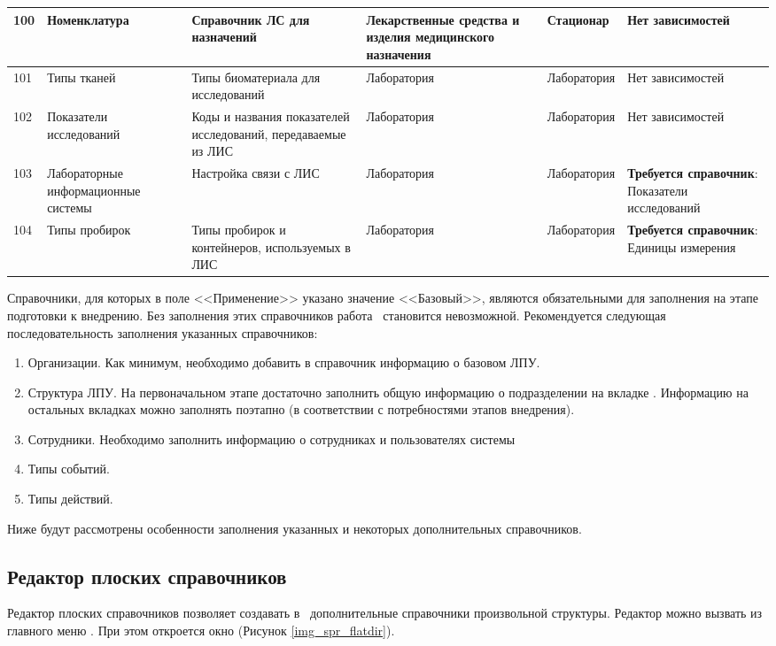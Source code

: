 {\begin{longtable}{|p{0.55cm}|p{2.45cm}|p{5.65cm}|p{1.85cm}|p{1.95cm}|p{3.2cm}|}
100	& Номенкла\-ту\-ра &	Справочник ЛС для назначений	& Лекарст\-венные средства и изделия медицинского назначения &	Стацио\-нар &	Нет зависимостей \\ \hline
101 &	Типы тканей	& Типы биоматериала для исследований	& Лаборато\-рия	& Лаборато\-рия	& Нет зависимостей \\ \hline
102	& Показатели исследований	& Коды и названия показателей исследований, передаваемые из ЛИС	& Лаборато\-рия	& Лаборато\-рия & Нет зависимостей \\ \hline
103	& Лаборатор\-ные информационные системы &	Настройка связи с ЛИС &	Лаборато\-рия	& Лаборато\-рия	& \textbf{Требуется справочник}: Показатели исследований \\ \hline
104	& Типы пробирок &	Типы пробирок и контейнеров, используемых в ЛИС	& Лаборато\-рия	& Лаборато\-рия	& \textbf{Требуется справочник}: Единицы измерения \\ \hline 
\end{longtable}
}

Справочники, для которых в поле <<Применение>> указано значение <<Базовый>>, являются обязательными для заполнения на этапе подготовки к внедрению. Без заполнения этих справочников работа \tmis~становится невозможной. Рекомендуется следующая последовательность заполнения указанных справочников:
\begin{enumerate}
 \item Организации. Как минимум, необходимо добавить в справочник информацию о базовом ЛПУ.
 \item Структура ЛПУ. На первоначальном этапе достаточно заполнить общую информацию о подразделении на вкладке . Информацию на остальных вкладках можно заполнять поэтапно (в соответствии с потребностями этапов внедрения).
 \item Сотрудники. Необходимо заполнить информацию о сотрудниках и пользователях системы
 \item Типы событий.
 \item Типы действий.
\end{enumerate}
 
Ниже будут рассмотрены особенности заполнения указанных и некоторых дополнительных справочников.

\subsection{Редактор плоских справочников}

Редактор плоских справочников позволяет создавать в \tmis~дополнительные справочники произвольной структуры. Редактор можно вызвать из главного меню . При этом откроется окно (Рисунок \ref{img_spr_flatdir}).

